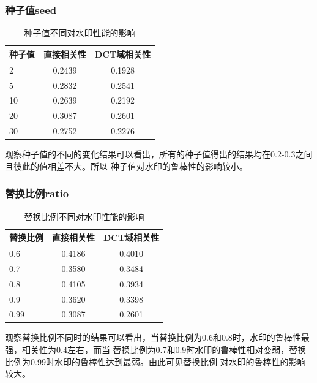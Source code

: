 \documentclass[a4paper,11pt,UTF8]{ctexart}
\begin{document}
    \subsubsection{种子值seed}
      \begin{table}[H]
        \caption{种子值不同对水印性能的影响}\label{tab4}
          \centering
        \begin{tabular*}{0.75\textwidth}{@{\extracolsep{\fill}}lcc}
            \toprule
            种子值                 &直接相关性        &DCT域相关性                         \\
            \midrule
            2                      &0.2439           &0.1928                                      \\
            5                      &0.2832           &0.2541                                      \\
            10                     &0.2639           &0.2192                                        \\
            20                     &0.3087           &0.2601                                    \\ 
            30                     &0.2752           &0.2276\\
            \bottomrule
        \end{tabular*}
      \end{table}
      观察种子值的不同的变化结果可以看出，所有的种子值得出的结果均在0.2-0.3之间且彼此的值相差不大。所以
      种子值对水印的鲁棒性的影响较小。

    \subsubsection{替换比例ratio}
      \begin{table}[H]
        \caption{替换比例不同对水印性能的影响}\label{tab5}
          \centering
        \begin{tabular*}{0.75\textwidth}{@{\extracolsep{\fill}}lcc}
            \toprule
            替换比例                 &直接相关性        &DCT域相关性                         \\
            \midrule
            0.6                      &0.4186           &0.4010                                      \\
            0.7                      &0.3580           &0.3484                                      \\
            0.8                      &0.4105           &0.3934                                        \\
            0.9                      &0.3620           &0.3398                                    \\ 
            0.99                     &0.3087           &0.2601\\
            \bottomrule
        \end{tabular*}
      \end{table}
      观察替换比例不同时的结果可以看出，当替换比例为0.6和0.8时，水印的鲁棒性最强，相关性为0.4左右，而当
      替换比例为0.7和0.9时水印的鲁棒性相对变弱，替换比例为0.99时水印的鲁棒性达到最弱。由此可见替换比例
      对水印的鲁棒性的影响较大。
\end{document}
